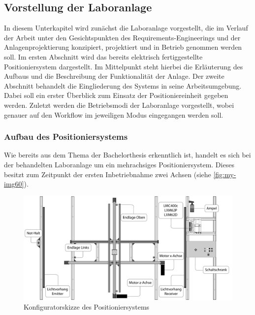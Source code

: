 \documentclass[../../../Bachelorarbeit.tex]{subfiles}
\begin{document}
\subsection{Vorstellung der Laboranlage}
In diesem Unterkapitel wird zunächst die Laboranlage vorgestellt, die im Verlauf der Arbeit unter den Gesichtspunkten des Requirements-Engineerings und der Anlagenprojektierung konzipiert, projektiert und in Betrieb genommen werden soll. Im ersten Abschnitt wird das bereits elektrisch fertiggestellte Positioniersystem dargestellt. Im Mittelpunkt steht hierbei die Erläuterung des Aufbaus und die Beschreibung der Funktionalität der Anlage. Der zweite Abschnitt behandelt die Eingliederung des Systems in seine Arbeitsumgebung. Dabei soll ein erster Überblick zum Einsatz der Positioniereinheit gegeben werden. Zuletzt werden die Betriebsmodi der Laboranlage vorgestellt, wobei genauer auf den Workflow im jeweiligen Modus eingegangen werden soll.

\subsubsection{Aufbau des Positioniersystems} \label{aufbau}
Wie bereits aus dem Thema der Bachelorthesis erkenntlich ist, handelt es sich bei der behandelten Laboranlage um ein mehrachsiges Positioniersystem. Dieses besitzt zum Zeitpunkt der ersten Inbetriebnahme zwei Achsen (siehe \autoref{fig:my-img60}).\\

\begin{figure}[H]
    \centering
    \includegraphics[width=\textwidth]{Images/konfigurator.pdf}
    \caption[Konfigurator]{Konfiguratorskizze des Positioniersystems}
    \label{fig:my-img60}
\end{figure}
\end{document}
